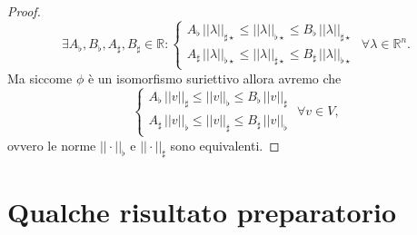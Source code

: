 \begin{proof}
    $$
    \exists A_\flat, B_\flat, A_\sharp, B_\sharp \in \mathbb{R} : \begin{cases}
        A_\flat \, ||\lambda||_{\sharp\star} \leq ||\lambda||_{\flat\star} \leq B_\flat \, ||\lambda||_{\sharp\star} \\
        A_\sharp \, ||\lambda||_{\flat\star} \leq ||\lambda||_{\sharp\star} \leq B_\sharp \, ||\lambda||_{\flat\star}
    \end{cases} \, \, \forall \lambda \in \mathbb{R}^n.
    $$
    Ma siccome $\phi$ è un isomorfismo suriettivo allora avremo che
    $$
    \begin{cases}
        A_\flat \, ||v||_{\sharp} \leq ||v||_{\flat} \leq B_\flat \, ||v||_{\sharp} \\
        A_\sharp \, ||v||_{\flat} \leq ||v||_{\sharp} \leq B_\sharp \, ||v||_{\flat}
    \end{cases} \, \, \forall v \in V,
    $$
    ovvero le norme $||\cdot||_{\flat}$ e $||\cdot||_{\sharp}$ sono equivalenti.
\end{proof}
\section{Qualche risultato preparatorio}

